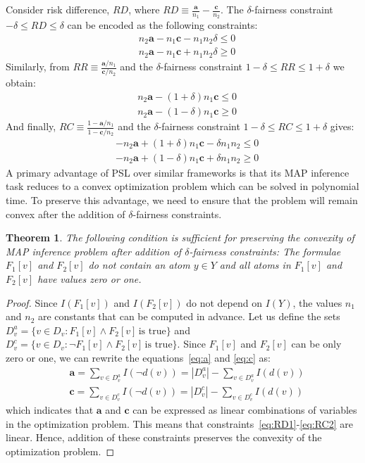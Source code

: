 \documentclass[11pt]{article}
\newtheorem{mytheorem}{\textbf{Theorem}}
\begin{document}
Consider risk difference, $\textit{RD}$, where $\textit{RD} \equiv \frac{\mathbf{a}}{n_1} - \frac{\mathbf{c}}{n_2}$. The $\delta$-fairness constraint $-\delta \leq \textit{RD} \leq \delta$ can be encoded as the following constraints:
{\begin{align}
    & n_2 \mathbf{a} - n_1 \mathbf{c} - n_1 n_2 \delta \leq 0 \label{eq:RD1}\\
    & n_2 \mathbf{a} - n_1 \mathbf{c} + n_1 n_2 \delta \geq 0
\end{align}}
Similarly, from $\textit{RR} \equiv \frac{\mathbf{a} / n_1}{\mathbf{c} / n_2}$ and the $\delta$-fairness constraint $1 - \delta \leq \textit{RR} \leq 1 + \delta$ we obtain:
{\begin{align}
    & n_2 \mathbf{a} - (1 + \delta) n_1 \mathbf{c} \leq 0 \\
    & n_2 \mathbf{a} - (1 - \delta) n_1 \mathbf{c} \geq 0
\end{align}}
And finally, $\textit{RC} \equiv \frac{1 - \mathbf{a} / n_1}{1 - \mathbf{c} / n_2}$ and the $\delta$-fairness constraint $1 - \delta \leq \textit{RC} \leq 1 + \delta$ gives:
{ \begin{align}
    & - n_2 \mathbf{a} + (1 + \delta) n_1 \mathbf{c} - \delta n_1 n_2 \leq 0 \\
    & - n_2 \mathbf{a} + (1 - \delta) n_1 \mathbf{c} + \delta n_1 n_2 \geq 0 \label{eq:RC2}
\end{align}}
A primary advantage of PSL over similar frameworks is that its MAP inference task reduces to a convex optimization problem which can be solved in polynomial time. To preserve this advantage, we need to ensure that the problem will remain convex after the addition of $\delta$-fairness constraints. 

\begin{mytheorem}
The following condition is sufficient for preserving the convexity of MAP inference problem after addition of $\delta$-fairness constraints: The formulae $F_1[v]$ and $F_2[v]$ do not contain an atom $y \in Y$ and all atoms in $F_1[v]$ and $F_2[v]$ have values zero or one.
\end{mytheorem}
\begin{proof}
Since $I(F_1[v])$ and $I(F_2[v])$ do not depend on $I(Y)$, the values $n_{1}$ and $n_{2}$ are constants that can be computed in advance. Let us define the sets $D_v^a = \{ v \in D_v : F_1[v] \wedge F_2[v] \, \text{is true} \}$ and $D_v^c = \{ v \in D_v : \neg F_1[v] \wedge F_2[v] \, \text{is true} \}$. Since $F_1[v]$ and $F_2[v]$ can be only zero or one, we can rewrite the equations~\ref{eq:a} and \ref{eq:c} as:
{
\begin{align*}
    & \mathbf{a} = \sum_{v \in D_v^a} I(\neg d(v)) = |D_v^a| - \sum_{v \in D_v^a} I(d(v))\\
    & \mathbf{c} = \sum_{v \in D_v^c} I(\neg d(v)) = |D_v^c| - \sum_{v \in D_v^c} I(d(v))
\end{align*}}
\noindent which indicates that $\mathbf{a}$ and $\mathbf{c}$ can be expressed as linear combinations of variables in the optimization problem. This means that constraints~\ref{eq:RD1}-\ref{eq:RC2} are linear. Hence, addition of these constraints preserves the convexity of the optimization problem. 
\end{proof}
\end{document}
